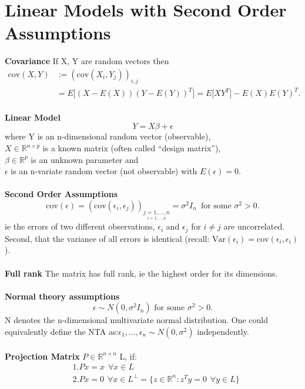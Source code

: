 \documentclass{article}
\begin{document}
\section{Linear Models with Second Order Assumptions
}
\textbf{Covariance}
If X, Y are random vectors then 
\begin{align*}
    \text{cov}(X, Y) &:=(\text{cov}(X_i , Y_j ))_{i ,j}
    \\
&= E \bigg [(X - E(X))(Y - E(Y))^T \bigg ] = E \big [XY^T \big ] - E(X) E(Y)^T .
\end{align*}
\\
\textbf{Linear Model}
$$
Y = X \beta + \epsilon
$$
where
Y is an n-dimensional random vector (observable),\\
$X \in \mathbb{R}^{n \times p}$ is a known matrix (often called “design matrix”), \\
$\beta \in \mathbb{R}^p$ is an unknown parameter and\\
$\epsilon$ is an n-variate random vector (not observable) with $E(\epsilon) = 0$.
\\
\\
\textbf{Second Order Assumptions}
$$ \text{cov}(\epsilon) = (\text{cov}(\epsilon_i,\epsilon_j))_{\underset{i=1,...,n}{ j = 1,...,n}}  = \sigma^2 I_n \hspace{6pt} \text{for some }\sigma^2 > 0.$$
ie the errors of two different observations, $\epsilon_i$ and $\epsilon_j$ for $i \ne j$ are uncorrelated. Second, that the variance of all errors is identical (recall: $\text{Var}(\epsilon_i ) = \text{cov}(\epsilon_i,\epsilon_i)$).
\\
\\
\textbf{Full rank} The matrix has full rank, ie the highest order for its dimensions.
\\
\\
\textbf{Normal theory assumptions }
$$ \epsilon \sim N(0, \sigma^2 I_n) \text{ for some } \sigma^2 > 0.$$
N denotes the n-dimensional multivariate normal distribution. One could equivalently define the
NTA as:$ \epsilon_1,...,\epsilon_n \sim N(0, \sigma^2)$ independently.
\\
\\
\textbf{Projection Matrix}
$P \in \mathbb{R}^{n \times n}$
L, if:
\begin{align*}
    &1.Px=x \hspace{5pt} \forall x \in L
    \\
    &2.Px=0 \hspace{5pt}\forall x \in L^\perp = \{ z \in \mathbb{R}^n :z^Ty= 0 \hspace{5pt}\forall y \in L \}
\end{align*}
\end{document}
